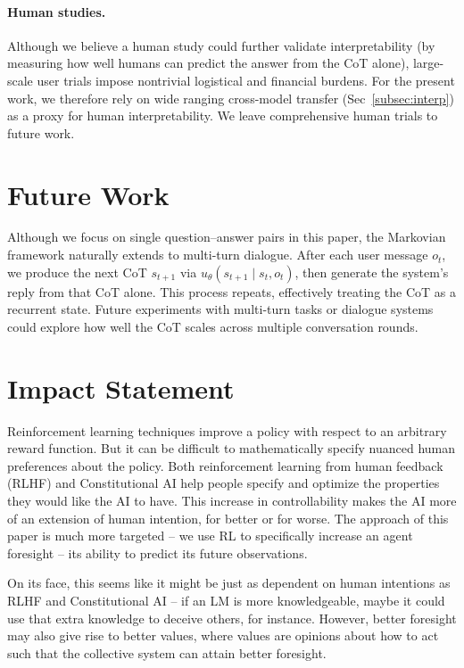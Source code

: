 \documentclass{article}
\theoremstyle{plain}
\theoremstyle{definition}
\theoremstyle{remark}
\begin{document}
\paragraph{Human studies.} Although we believe a human study could further validate interpretability (by measuring how well humans can predict the answer from the CoT alone), large-scale user trials impose nontrivial logistical and financial burdens. For the present work, we therefore rely on wide ranging cross-model transfer  (Sec~\ref{subsec:interp}) as a proxy for human interpretability. We leave comprehensive human trials to future work.

\section{Future Work}
\label{sec:future}

Although we focus on single question–answer pairs in this paper, the Markovian framework naturally extends to multi-turn dialogue. After each user message $o_t$, we produce the next CoT $s_{t+1}$ via $u_\theta(s_{t+1}\mid s_t,o_t)$, then generate the system's reply from that CoT alone. This process repeats, effectively treating the CoT as a recurrent state. Future experiments with multi-turn tasks or dialogue systems could explore how well the CoT scales across multiple conversation rounds.


\section{Impact Statement}
\label{sec:ethics}
Reinforcement learning techniques improve a policy with respect to an arbitrary reward function. But it can be difficult to mathematically specify nuanced human preferences about the policy. Both reinforcement learning from human feedback (RLHF) \citep{christiano2023deepreinforcementlearninghuman} and Constitutional AI \citep{bai2022constitutional} help people specify and optimize the properties they would like the AI to have. This increase in controllability makes the AI more of an extension of human intention, for better or for worse. The approach of this paper is much more targeted -- we use RL to specifically increase an agent foresight -- its ability to predict its future observations. 

On its face, this seems like it might be just as dependent on human intentions as RLHF and Constitutional AI -- if an LM is more knowledgeable, maybe it could use that extra knowledge to deceive others, for instance. However, better foresight may also give rise to better values, where values are opinions about how to act such that the collective system can attain better foresight.
\end{document}
